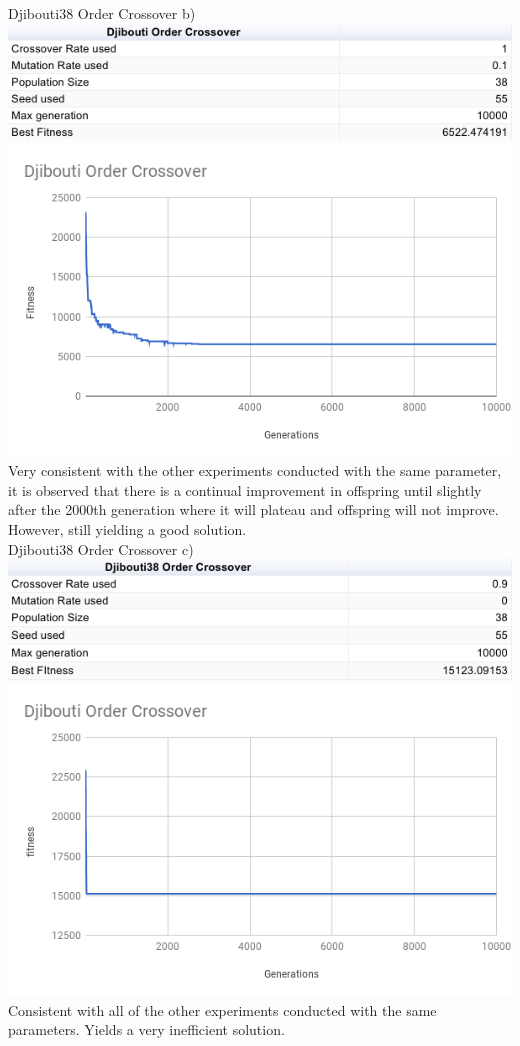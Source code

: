 \documentclass[conference]{IEEEtran}
\begin{document}
Djibouti38 Order Crossover b)
\includegraphics[scale=0.42]{Djibouti38/OC/Djibouti38_OC_b)_table}
\includegraphics[scale=0.42]{Djibouti38/OC/Djibouti38_OC_b)}
Very consistent with the other experiments conducted with the same parameter, it is observed that there is a continual improvement in offspring until slightly after the 2000th generation where it will plateau and offspring will not improve. However, still yielding a good solution.\\


Djibouti38 Order Crossover c)
\includegraphics[scale=0.42]{Djibouti38/OC/Djibouti38_OC_c)_table}
\includegraphics[scale=0.42]{Djibouti38/OC/Djibouti38_OC_c)}
Consistent with all of the other experiments conducted with the same parameters. Yields a very inefficient solution.\\
\end{document}
